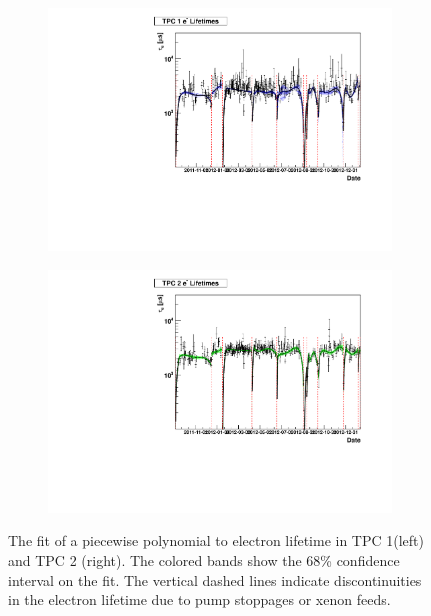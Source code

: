 \documentclass[herrin-thesis.tex]{subfiles}
\begin{document}
\begin{figure}[htb]
\begin{subfigure}[b]{0.5\linewidth}
\centering
\includegraphics[width=1.0\columnwidth]{./plots/el_trend_tpc1.pdf}
\end{subfigure}%
\begin{subfigure}[b]{0.5\linewidth}
\centering
\includegraphics[width=1.0\columnwidth]{./plots/el_trend_tpc2.pdf}
\end{subfigure}
\caption[Fit to time-varying electron lifetime]{The fit of a piecewise polynomial to electron lifetime in TPC 1(left) and TPC 2 (right). The colored bands show the 68\% confidence interval on the fit. The vertical dashed lines indicate discontinuities in the electron lifetime due to pump stoppages or xenon feeds.}
\label{fig:el_time_variation}
\end{figure}
\end{document}
